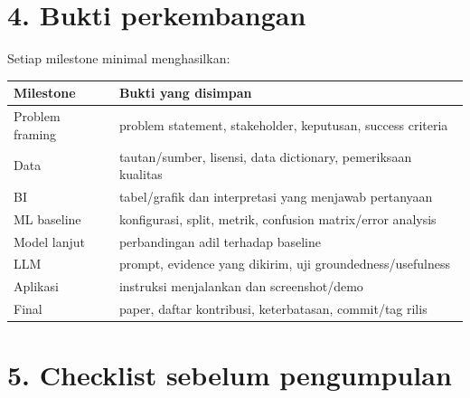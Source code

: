 \documentclass[
  indonesian,
  letterpaper,
  DIV=11,
  numbers=noendperiod]{scrreprt}
\newcounter{none} %
\begin{document}
\section{4. Bukti perkembangan}\label{bukti-perkembangan}

Setiap milestone minimal menghasilkan:

{\def\LTcaptype{none} %
\begin{longtable}[]{@{}
  >{\raggedright\arraybackslash}p{}
  >{\raggedright\arraybackslash}p{}@{}}
\toprule\noalign{}
\begin{minipage}[b]{\linewidth}\raggedright
Milestone
\end{minipage} & \begin{minipage}[b]{\linewidth}\raggedright
Bukti yang disimpan
\end{minipage} \\
\midrule\noalign{}
\endhead
\bottomrule\noalign{}
\endlastfoot
Problem framing & problem statement, stakeholder, keputusan, success
criteria \\
Data & tautan/sumber, lisensi, data dictionary, pemeriksaan kualitas \\
BI & tabel/grafik dan interpretasi yang menjawab pertanyaan \\
ML baseline & konfigurasi, split, metrik, confusion matrix/error
analysis \\
Model lanjut & perbandingan adil terhadap baseline \\
LLM & prompt, evidence yang dikirim, uji groundedness/usefulness \\
Aplikasi & instruksi menjalankan dan screenshot/demo \\
Final & paper, daftar kontribusi, keterbatasan, commit/tag rilis \\
\end{longtable}
}

\section{5. Checklist sebelum
pengumpulan}\label{checklist-sebelum-pengumpulan}
\end{document}
